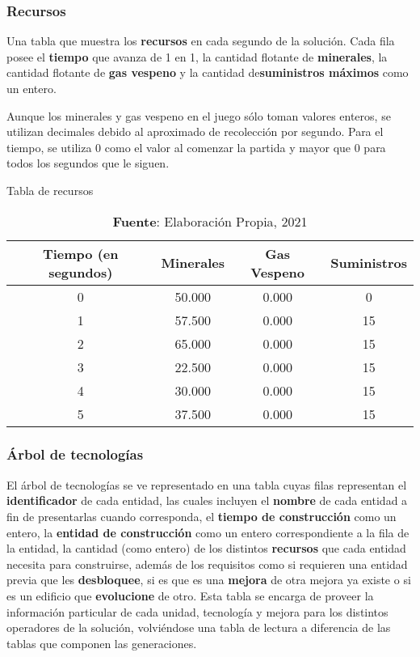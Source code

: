 \subsubsection{Recursos}

Una tabla que muestra los \textbf{recursos} en cada segundo de la solución. Cada fila posee el \textbf{tiempo} que avanza de 1 en 1, la cantidad flotante de \textbf{minerales}, la cantidad flotante de \textbf{gas vespeno} y la cantidad de\textbf{suministros máximos} como un entero.

Aunque los minerales y gas vespeno en el juego sólo toman valores enteros, se utilizan decimales debido al aproximado de recolección por segundo. Para el tiempo, se utiliza 0 como el valor al comenzar la partida y mayor que 0 para todos los segundos que le siguen.

\begin{table}[H]
\centering
\def\arraystretch{1.8}
\captionsetup{justification=centering}
\caption{Tabla de recursos}
\label{tab:8}
\begin{tabular}{|c|c|c|c|}
\hline
\textbf{Tiempo (en segundos)} & \textbf{Minerales} & \textbf{Gas Vespeno} & \textbf{Suministros} \\
\hline 
0 & 50.000 & 0.000 & 0 \\ \hline
1 & 57.500 & 0.000 & 15 \\ \hline
2 & 65.000 & 0.000 & 15 \\ \hline
3 & 22.500 & 0.000 & 15 \\ \hline
4 & 30.000 & 0.000 & 15 \\ \hline
5 & 37.500 & 0.000 & 15 \\ \hline
\end{tabular}
\caption*{\textbf{Fuente}: Elaboración Propia, 2021}
\end{table}

\subsubsection{Árbol de tecnologías}

El árbol de tecnologías se ve representado en una tabla cuyas filas representan el \textbf{identificador} de cada entidad, las cuales incluyen el \textbf{nombre} de cada entidad a fin de presentarlas cuando corresponda, el \textbf{tiempo de construcción} como un entero, la \textbf{entidad de construcción} como un entero correspondiente a la fila de la entidad, la cantidad (como entero) de los distintos \textbf{recursos} que cada entidad necesita para construirse, además de los requisitos como si requieren una entidad previa que les \textbf{desbloquee}, si es que es una \textbf{mejora} de otra mejora ya existe o si es un edificio que \textbf{evolucione} de otro. Esta tabla se encarga de proveer la información particular de cada unidad, tecnología y mejora para los distintos operadores de la solución, volviéndose una tabla de lectura a diferencia de las tablas que componen las generaciones.

